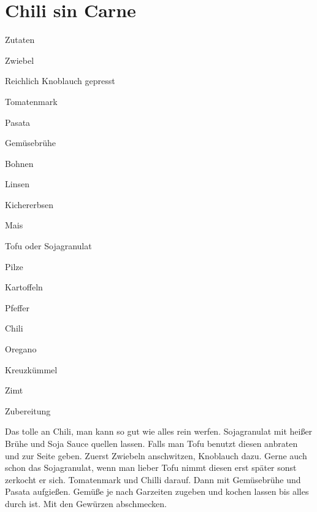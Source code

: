 \chapter*{Chili sin Carne}
\begin{multicols}{2}
 {\Large Zutaten}
 \begin{Zutaten}
		\item Zwiebel
		\item Reichlich Knoblauch gepresst
		\item Tomatenmark
		\item Pasata
		\item Gemüsebrühe
		\item Bohnen
		\item Linsen
		\item Kichererbsen
		\item Mais
		\item Tofu oder Sojagranulat
		\item Pilze
		\item Kartoffeln
		\item Pfeffer
		\item Chili
		\item Oregano
		\item Kreuzkümmel
		\item Zimt
		
\end{Zutaten}
	
\columnbreak
\end{multicols}

{\Large Zubereitung} \newline
\begin{addmargin}[1cm]{0cm}
	Das tolle an Chili, man kann so gut wie alles rein werfen.\newline
	Sojagranulat mit heißer Brühe und Soja Sauce quellen lassen. Falls man Tofu benutzt diesen anbraten und zur Seite geben. \newline
	Zuerst Zwiebeln anschwitzen, Knoblauch dazu. Gerne auch schon das Sojagranulat, wenn man lieber Tofu nimmt diesen erst später sonst zerkocht er sich.\newline
	Tomatenmark und Chilli darauf. Dann mit Gemüsebrühe und Pasata aufgießen.\newline
	Gemüße je nach Garzeiten zugeben und kochen lassen bis alles durch ist. \newline
	Mit den Gewürzen abschmecken.
	
	
\end{addmargin}

